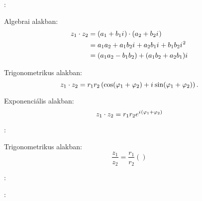 \documentclass[a4paper, 12pt]{scrartcl}
\begin{document}
\begin{blueBox}
  :

  \begin{minipage}{.6\textwidth}
    Algebrai alakban:
    \begin{align*}
      z_1 \cdot z_2
       & = (a_1 + b_1{i\mkern1mu}) \cdot (a_2 + b_2{i\mkern1mu})              \\
       & = a_1 a_2 + a_1 b_2{i\mkern1mu} + a_2 b_1{i\mkern1mu} + b_1 b_2{i\mkern1mu}^2 \\
       & = (a_1 a_2 - b_1 b_2) + (a_1 b_2 + a_2 b_1){i\mkern1mu}
    \end{align*}

    Trigonometrikus alakban:
    \[
      z_1 \cdot z_2 = r_1 r_2 \left(
      \cos(\varphi_1 + \varphi_2) + {i\mkern1mu} \sin(\varphi_1 + \varphi_2)
      \right)
      \text.
    \]

    Exponenciális alakban:
    \[
      z_1 \cdot z_2 = r_1 r_2 e^{{i\mkern1mu} (\varphi_1 + \varphi_2)}
    \]
  \end{minipage}\begin{minipage}{.4\textwidth}
    \centering
  \end{minipage}
\end{blueBox}

\begin{blueBox}
  :

  \begin{minipage}{.6\textwidth}
    Trigonometrikus alakban:
    \[
      \frac{z_1}{z_2} = \frac{r_1}{r_2} \left(

      \right)
    \]
  \end{minipage}\begin{minipage}{.4\textwidth}
    \centering
  \end{minipage}
\end{blueBox}

\begin{blueBox}
  :

  \begin{minipage}{.6\textwidth}
  \end{minipage}\begin{minipage}{.4\textwidth}
    \centering
  \end{minipage}
\end{blueBox}

\begin{blueBox}
  :

  \begin{minipage}{.6\textwidth}
  \end{minipage}\begin{minipage}{.4\textwidth}
    \centering
  \end{minipage}
\end{blueBox}
\end{document}
